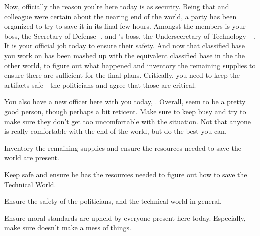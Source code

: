 \documentclass[char]{guildcamp3}
\begin{document}
Now, officially the reason you're here today is as security. Being that \cSciOne{\informal} and \cSciOne{\their} colleague were certain about the nearing end of the world, a party has been organized to try to save it in its final few hours. Amongst the members is your boss, the Secretary of Defense -\cPoliOne{\intro}, and \cSciOne{\informal}'s boss, the Undersecretary of Technology - \cPoliTwo{\intro}. It is your official job today to ensure their safety. And now that classified base you work on has been mashed up with the equivalent classified base in the the other world, to figure out what happened and inventory the remaining supplies to ensure there are sufficient for the final plans. Critically, you need to keep the artifacts safe - the politicians and \cSciOne{\informal} agree that those are critical. 

You also have a new officer here with you today, \cSpecOpTwo{\intro}. Overall, \cSpecOpTwo{\they} seem to be a pretty good person, though perhaps a bit reticent. Make sure to keep \cSpecOpTwo{\them} busy and try to make sure they don't get too uncomfortable with the situation. Not that anyone is really comfortable with the end of the world, but do the best you can. 




\begin{itemz}[Goals]
  \item Inventory the remaining supplies and ensure the resources needed to save the world are present.
  \item Keep \cSciOne{\informal{}} safe and ensure he has the resources needed to figure out how to save the Technical World. 
  \item Ensure the safety of the politicians, and the technical world in general.
  \item Ensure moral standards are upheld by everyone present here today. Especially, make sure \cRogueTwo{\full{}} doesn't make a mess of things. 
\end{itemz}
\end{document}
